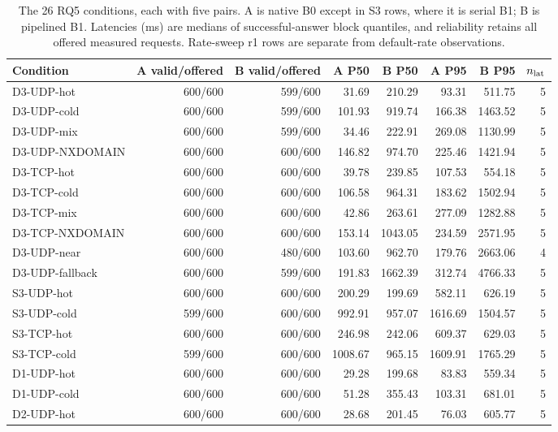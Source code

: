 \begin{table}[t]
\centering\small
\setlength{\tabcolsep}{3.5pt}
\caption{The 26 RQ5 conditions, each with five pairs. A is native B0 except in S3 rows, where it is serial B1; B is pipelined B1. Latencies (ms) are medians of successful-answer block quantiles, and reliability retains all offered measured requests. Rate-sweep r1 rows are separate from default-rate observations.}
\label{tab:rq5-all}
\begin{tabularx}{\textwidth}{@{}Xr r r r r r r@{}}
\toprule
Condition & A valid/offered & B valid/offered & A P50 & B P50 & A P95 & B P95 & $n_{\rm lat}$ \\
\midrule
D3-UDP-hot & 600/600 & 599/600 & 31.69 & 210.29 & 93.31 & 511.75 & 5 \\
D3-UDP-cold & 600/600 & 599/600 & 101.93 & 919.74 & 166.38 & 1463.52 & 5 \\
D3-UDP-mix & 600/600 & 599/600 & 34.46 & 222.91 & 269.08 & 1130.99 & 5 \\
D3-UDP-NXDOMAIN & 600/600 & 600/600 & 146.82 & 974.70 & 225.46 & 1421.94 & 5 \\
D3-TCP-hot & 600/600 & 600/600 & 39.78 & 239.85 & 107.53 & 554.18 & 5 \\
D3-TCP-cold & 600/600 & 600/600 & 106.58 & 964.31 & 183.62 & 1502.94 & 5 \\
D3-TCP-mix & 600/600 & 600/600 & 42.86 & 263.61 & 277.09 & 1282.88 & 5 \\
D3-TCP-NXDOMAIN & 600/600 & 600/600 & 153.14 & 1043.05 & 234.59 & 2571.95 & 5 \\
D3-UDP-near & 600/600 & 480/600 & 103.60 & 962.70 & 179.76 & 2663.06 & 4 \\
D3-UDP-fallback & 600/600 & 599/600 & 191.83 & 1662.39 & 312.74 & 4766.33 & 5 \\
S3-UDP-hot & 600/600 & 600/600 & 200.29 & 199.69 & 582.11 & 626.19 & 5 \\
S3-UDP-cold & 599/600 & 600/600 & 992.91 & 957.07 & 1616.69 & 1504.57 & 5 \\
S3-TCP-hot & 600/600 & 600/600 & 246.98 & 242.06 & 609.37 & 629.03 & 5 \\
S3-TCP-cold & 599/600 & 600/600 & 1008.67 & 965.15 & 1609.91 & 1765.29 & 5 \\
D1-UDP-hot & 600/600 & 600/600 & 29.28 & 199.68 & 83.83 & 559.34 & 5 \\
D1-UDP-cold & 600/600 & 600/600 & 51.28 & 355.43 & 103.31 & 681.01 & 5 \\
D2-UDP-hot & 600/600 & 600/600 & 28.68 & 201.45 & 76.03 & 605.77 & 5 \\

\end{tabularx}
\end{table}
